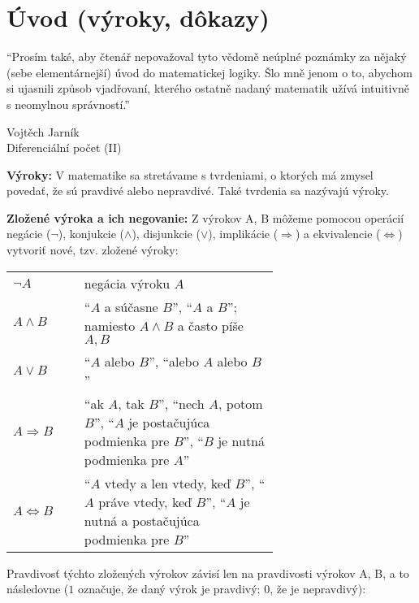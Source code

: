 \chapter*{Úvod (výroky, dôkazy)}

\epigraph{
  \enquote{Prosím také, aby čtenář nepovažoval tyto vědomě neúplné poznámky za
  nějaký (sebe elementárnejší) úvod do matematickej logiky. Šlo mně jenom o to,
  abychom si ujasnili způsob vjadřovaní, kterého ostatně nadaný matematik užívá
  intuitivně s neomylnou správností.}
}{
  Vojtěch Jarník \\
  Diferenciální počet (II)
}

\textbf{Výroky:}
V matematike sa stretávame s tvrdeniami, o ktorých má
zmysel povedať, že sú pravdivé alebo nepravdivé. Také tvrdenia sa nazývajú
výroky.

\textbf{Zložené výroka a ich negovanie:}
Z výrokov A, B môžeme pomocou operácií negácie ($\neg$), konjukcie
($\land$), disjunkcie ($\lor$), implikácie ($\Rightarrow$) a ekvivalencie
($\iff$) vytvoriť nové, tzv. zložené výroky:

\begin{center}
  \begin{tabular}{ m{0.15\linewidth} p{0.5\linewidth} }
    $\neg A$ & negácia výroku $A$ \\
    \bigskip
    $A \land B$
      & \enquote{$A$ a súčasne $B$},
        \enquote{$A$ a $B$};
        namiesto $A \land B$ a často píše $A, B$ \\
    \bigskip
    $A \lor B$
      & \enquote{$A$ alebo $B$},
        \enquote{alebo $A$ alebo $B$} \\
    \bigskip
    $A \Rightarrow B$
      & \enquote{ak $A$, tak $B$},
        \enquote{nech $A$, potom $B$},
        \enquote{$A$ je postačujúca podmienka pre $B$},
        \enquote{$B$ je nutná podmienka pre $A$} \\
    \bigskip
    $A \iff B$
      & \enquote{$A$ vtedy a len vtedy, keď $B$},
        \enquote{$A$ práve vtedy, keď $B$},
        \enquote{$A$ je nutná a postačujúca podmienka pre $B$}
  \end{tabular}
\end{center}

Pravdivosť týchto zložených výrokov závisí len na pravdivosti výrokov A, B, a
to následovne ($1$ označuje, že daný výrok je pravdivý; $0$, že je nepravdivý):

